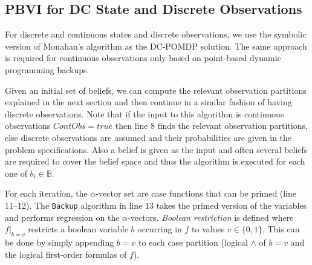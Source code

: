 \documentclass{article} %
\begin{document}
\subsection{PBVI for DC State and Discrete Observations} 

For discrete and continuous states and discrete observations, we use the symbolic version of Monahan's algorithm as the DC-POMDP solution. The same approach is required for continuous observations only based on point-based dynamic programming backups.

Given an initial set of beliefs, we can compute the relevant observation partitions explained in the next section and then continue in a similar fashion of having discrete observations. %
Note that if the input to this algorithm is continuous observations $ContObs=true$ then line 8 finds the relevant observation partitions, else discrete observations are assumed and their probabilities are given in the problem specifications. Also a belief is given as the input and often several beliefs are required to cover the belief space and thus the algorithm is executed for each one of $b_i \in \mathbb{B}$.

For each iteration, the $\alpha$-vector set are case functions that can be primed (line 11--12). 
The \texttt{Backup} algorithm in line 13 takes the primed version of the variables and performs regression on the $\alpha$-vectors. 
\emph{Boolean restriction} is defined where $f|_{b=v}$ restricts a boolean variable $b$ occurring in $f$ to values $v \in \{ 0,1 \}$. This can be done by simply appending $b=v$ to each case partition (logical $\wedge$ of $b=v$ and the logical first-order formulas of $f$). 
\end{document}
